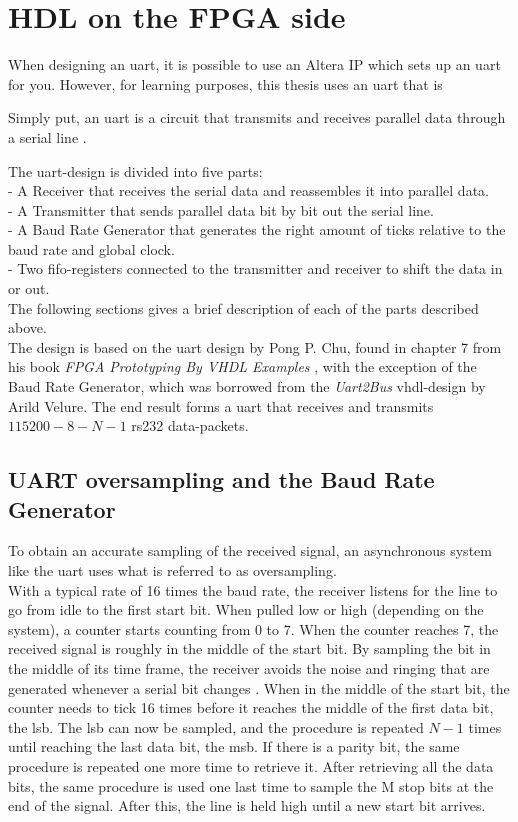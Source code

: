 \documentclass[main.tex]{subfiles}
\begin{document}
\section{HDL on the FPGA side}

When designing an \gls{uart}, it is possible to use an Altera IP which sets up an \gls{uart} for you. However, for learning purposes, this thesis uses an \gls{uart} that is  

Simply put, an \gls{uart} is a circuit that transmits and receives parallel data through a serial line \cite{chu08}.

The \gls{uart}-design is divided into five parts:\\
- A Receiver that receives the serial data and reassembles it into parallel data.\\
- A Transmitter that sends parallel data bit by bit out the serial line.\\
- A Baud Rate Generator that generates the right amount of ticks relative to the baud rate and global clock.\\
- Two \gls{fifo}-registers connected to the transmitter and receiver to shift the data in or out.\\

The following sections gives a brief description of each of the parts described above. \\
The design is based on the \gls{uart} design by Pong P. Chu, found in chapter 7 from his book \textit{FPGA Prototyping By VHDL Examples}  \cite{chu08}, with the exception of the Baud Rate Generator, which was borrowed from the \textit{Uart2Bus} \acrshort{vhdl}-design by Arild Velure. The end result forms a \gls{uart} that receives and transmits $115200-8-N-1$ \gls{rs232} data-packets.

\subsection{UART oversampling and the Baud Rate Generator}

To obtain an accurate sampling of the received signal, an asynchronous system like the \gls{uart} uses what is referred to as oversampling. \\
With a typical rate of 16 times the baud rate, the receiver listens for the line to go from idle to the first start bit. When pulled low or high (depending on the system), a counter starts counting from 0 to 7. When the counter reaches 7, the received signal is roughly in the middle of the start bit. By sampling the bit in the middle of its time frame, the receiver avoids the noise and ringing that are generated whenever a serial bit changes \cite{rapid08}. When in the middle of the start bit, the counter needs to tick 16 times before it reaches the middle of the first data bit, the \gls{lsb}. The \gls{lsb} can now be sampled, and the procedure is repeated $N - 1$ times until reaching the last data bit, the \acrshort{msb}. If there is a parity bit, the same procedure is repeated one more time to retrieve it. After retrieving all the data bits, the same procedure is used one last time to sample the M stop bits at the end of the signal. After this, the line is held high until a new start bit arrives. 
\end{document}
